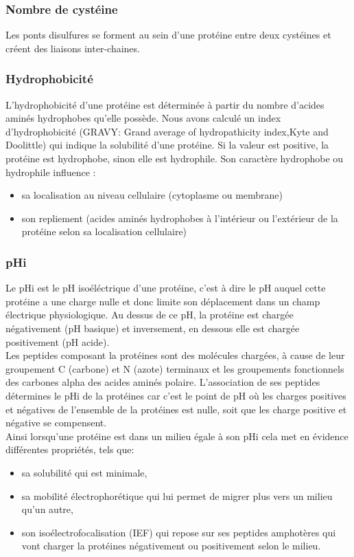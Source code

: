 \subsubsection*{Nombre de cystéine}
Les ponts disulfures se forment au sein d'une protéine entre deux cystéines et créent des liaisons inter-chaines. 


\subsubsection*{Hydrophobicité}
L'hydrophobicité d'une protéine est déterminée à partir du nombre d'acides aminés hydrophobes qu'elle possède.
Nous avons calculé un index d'hydrophobicité (GRAVY: Grand average of hydropathicity index,Kyte and Doolittle) qui indique la solubilité d'une protéine. Si la valeur est positive, la protéine est hydrophobe, sinon elle est hydrophile.
Son caractère hydrophobe ou hydrophile influence :
\begin{itemize}
\item sa localisation au niveau cellulaire (cytoplasme ou membrane)
\item son repliement (acides aminés hydrophobes à l'intérieur ou l'extérieur de la protéine selon sa localisation cellulaire) 
\end{itemize}

\subsubsection*{pHi}
Le pHi est le pH isoéléctrique d'une protéine, c'est à dire le pH auquel cette protéine a une charge nulle et donc limite son déplacement dans un champ électrique physiologique.
Au dessus de ce pH, la protéine est chargée négativement (pH basique) et inversement, en dessous elle est chargée positivement (pH acide).\\
Les peptides composant la protéines sont des molécules chargées, à cause de leur groupement C (carbone) et N (azote) terminaux et les groupements fonctionnels des carbones alpha des acides aminés polaire. L'association de ses peptides détermines le pHi de la protéines car c'est le point de pH où les charges positives et négatives de l'ensemble de la protéines est nulle, soit que les charge positive et négative se compensent.\\
Ainsi lorsqu'une protéine est dans un milieu égale à son pHi cela met en évidence différentes propriétés, tels que:
\begin{itemize}
\item sa solubilité qui est minimale,
\item sa mobilité électrophorétique qui lui permet de migrer plus vers un milieu qu'un autre,
\item son isoélectrofocalisation (IEF) qui repose sur ses peptides amphotères qui vont charger la protéines négativement ou positivement selon le milieu.
\end{itemize}



